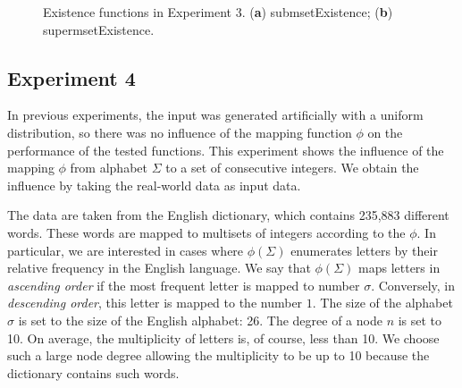 \documentclass[algorithms,article,accept,pdftex,moreauthors]{Definitions/mdpi}
\begin{document}
\begin{figure}[H]

\caption{Existence functions in Experiment 3. (\textbf{a}) submsetExistence; (\textbf{b}) supermsetExistence.\label{fig:e3m1}}
\end{figure}


\subsection{Experiment 4} \label{s:exp4}
In previous experiments, the input was generated artificially with a uniform 
distribution, so there was no influence of the mapping function $\phi$ on 
the performance of the tested functions. This experiment shows the influence of the 
mapping $\phi$ from alphabet $\Sigma$ to a set of consecutive integers. 
We obtain the influence by taking the real-world data as input data. 

The data are taken from the English dictionary, which contains 235,883 different words. 
These words are mapped to multisets of integers according to the $\phi.$ In 
particular, we are interested in cases where $\phi(\Sigma)$ enumerates 
letters by their relative frequency in the English language. We say that $\phi(\Sigma)$ 
maps letters in \emph{ascending order} if the most frequent letter is mapped to 
number $\sigma.$ Conversely, in \emph{descending order}, this letter is mapped to 
the number $1.$ The size of the alphabet $\sigma$ is set to the size of the English 
alphabet: 26. The degree of a node $n$ is set to 10. On average, the multiplicity 
of letters is, of course, less than 10. We choose such a large node degree allowing 
the multiplicity to be up to 10 because the dictionary contains such words. 
\end{document}
